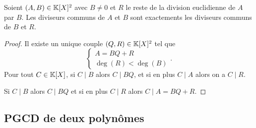 \begin{prop}
  Soient \((A,B)\in\mathbb{K}[X]^2\) avec \(B \neq 0\) et \(R\) le reste de la division euclidienne de \(A\) par \(B\). Les diviseurs communs de \(A\) et \(B\) sont exactements les diviseurs communs de \(B\) et \(R\).
\end{prop}
\begin{proof}
  Il existe un unique couple \((Q,R) \in \mathbb{K}[X]^2\) tel que 
  \begin{equation}
    \begin{cases} 
      A=BQ+R \\ \deg(R) < \deg(B) 
    \end{cases}.
  \end{equation}
  Pour tout \(C \in \mathbb{K}[X]\), si  \(C\mid{}B\) alors \(C\mid{}BQ\), et si en plus \(C\mid{}A\) alors on a \(C\mid{}R\).
  
  Si \(C\mid{}B\) alors \(C\mid{}BQ\) et si en plus \(C\mid{}R\) alors \(C\mid{}A=BQ+R\).
\end{proof}

\subsection{PGCD de deux polynômes}

